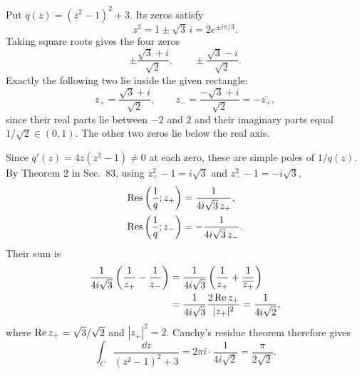 \documentclass[11pt,oneside]{article}
\begin{document}
\begin{solution}
Put $q(z)=(z^2-1)^2+3$. Its zeros satisfy
\[
    z^2=1\pm\sqrt3\,i
       =2e^{\pm i\pi/3}.
\]
Taking square roots gives the four zeros
\[
    \pm\frac{\sqrt3+i}{\sqrt2},
    \qquad\pm\frac{\sqrt3-i}{\sqrt2}.
\]
Exactly the following two lie inside the given rectangle:
\[
    z_+=\frac{\sqrt3+i}{\sqrt2},
    \qquad z_-=\frac{-\sqrt3+i}{\sqrt2}
         =-\overline{z_+},
\]
since their real parts lie between $-2$ and $2$ and their imaginary parts equal $1/\sqrt2\in(0,1)$. The other two zeros lie below the real axis.

Since $q'(z)=4z(z^2-1)\ne0$ at each zero, these are simple poles of $1/q(z)$. By Theorem 2 in Sec.~83, using $z_+^2-1=i\sqrt3$ and $z_-^2-1=-i\sqrt3$,
\[
\begin{aligned}
    \operatorname{Res}\left(\frac1q; z_+\right)
       &=\frac1{4i\sqrt3\,z_+},\\
    \operatorname{Res}\left(\frac1q; z_-\right)
       &=-\frac1{4i\sqrt3\,z_-}.
\end{aligned}
\]
Their sum is
\[
\begin{aligned}
    \frac1{4i\sqrt3}\left(\frac1{z_+}-\frac1{z_-}\right)
    &=\frac1{4i\sqrt3}\left(\frac1{z_+}+\frac1{\overline{z_+}}\right)\\
    &=\frac1{4i\sqrt3}\frac{2\operatorname{Re} z_+}{|z_+|^2}
      =\frac1{4i\sqrt2},
\end{aligned}
\]
where $\operatorname{Re} z_+=\sqrt3/\sqrt2$ and $|z_+|^2=2$. Cauchy's residue theorem therefore gives
\[
    \boxed{\int_C\frac{\dd z}{(z^2-1)^2+3}
      =2\pi i\cdot\frac1{4i\sqrt2}=\frac\pi{2\sqrt2}.}
\]
\end{solution}
\end{document}
